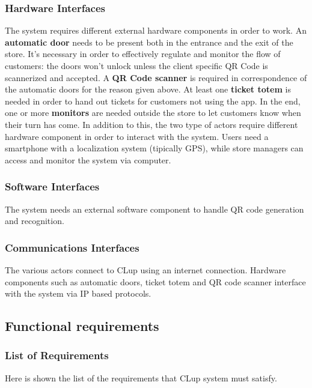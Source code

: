\documentclass[]{article}
\begin{document}
		
			\subsubsection{Hardware Interfaces}
			The system requires different external hardware components in order to work. \newline
			An \textbf{automatic door} needs to be present both in the entrance and the exit of the store. It's necessary in order to effectively regulate and monitor the flow of customers: the doors won't unlock unless the client specific QR Code is scannerized and accepted. \newline
			A \textbf{QR Code scanner} is required in correspondence of the automatic doors for the reason given above. \newline
			At least one \textbf{ticket totem} is needed in order to hand out tickets for customers not using the app. \newline
			In the end, one or more \textbf{monitors} are needed outside the store to let customers know when their turn has come. \newline \newline
			In addition to this, the  two type of actors require different hardware component in order to interact with the system. \newline
			Users need a smartphone with a localization system (tipically GPS), while store managers can access and monitor the system via computer.
			\subsubsection{Software Interfaces}
			The system needs an external software component to handle QR code generation and recognition.
			\subsubsection{Communications Interfaces}
			The various actors connect to CLup using an internet connection. \newline
			Hardware components such as automatic doors, ticket totem and QR code scanner interface with the system via IP based protocols.
		
		\newpage
		\subsection{Functional requirements}
			
			\subsubsection{List of Requirements}
			Here is shown the list of the requirements that CLup system must satisfy.
			\bigskip
				
\end{document}
